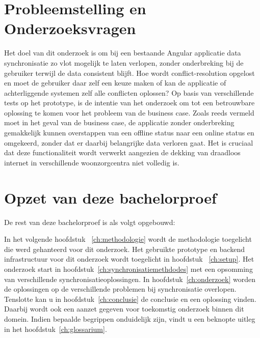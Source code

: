 \section{Probleemstelling en Onderzoeksvragen}
\label{sec:onderzoeksvragen}
Het doel van dit onderzoek is om bij een bestaande Angular applicatie data synchronisatie zo vlot mogelijk te laten verlopen, zonder onderbreking bij de gebruiker terwijl de data consistent blijft. Hoe wordt conflict-resolution opgelost en moet de gebruiker daar zelf een keuze maken of kan de applicatie of achterliggende systemen zelf alle conflicten oplossen? Op basis van verschillende tests op het prototype, is de intentie van het onderzoek om tot een betrouwbare oplossing te komen voor het probleem van de business case. Zoals reeds vermeld moet in het geval van de business case, de applicatie zonder onderbreking gemakkelijk kunnen overstappen van een offline status naar een online status en omgekeerd, zonder dat er daarbij belangrijke data verloren gaat. Het is cruciaal dat deze functionaliteit wordt verwerkt aangezien de dekking van draadloos internet in verschillende woonzorgcentra niet volledig is.

\section{Opzet van deze bachelorproef}
\label{sec:opzet-bachelorproef}


De rest van deze bachelorproef is als volgt opgebouwd:

In het volgende hoofdstuk ~\ref{ch:methodologie} wordt de methodologie toegelicht die werd gehanteerd voor dit onderzoek. Het gebruikte prototype en backend infrastructuur voor dit onderzoek wordt toegelicht in hoofdstuk ~\ref{ch:setup}. Het onderzoek start in hoofdstuk~\ref{ch:synchronisatiemethdodes} met een opsomming van verschillende synchronisatieoplossingen. In hoofdstuk~\ref{ch:onderzoek} worden de oplossingen op de verschillende problemen bij synchronisatie overlopen. Tenslotte kan u in hoofdstuk~\ref{ch:conclusie} de conclusie en een oplossing vinden. Daarbij wordt ook een aanzet gegeven voor toekomstig onderzoek binnen dit domein.
Indien bepaalde begrippen onduidelijk zijn, vindt u een beknopte uitleg in het hoofdstuk~\ref{ch:glossarium}.



